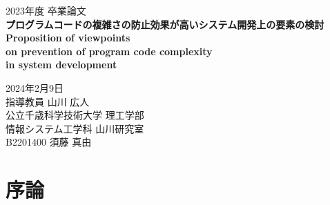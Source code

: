 \documentclass[12pt, a4paper]{jreport}
\begin{document}
    \thispagestyle{empty}
    \begin{center}

        \vspace{20mm}
        {\Large\noindent 2023年度 卒業論文}\\
        \vspace{40mm}
        {\huge\noindent\textbf{プログラムコードの複雑さの防止効果が高いシステム開発上の要素の検討}}\\
        \medskip
        \vspace{\baselineskip}
        {\LARGE\noindent\textbf{Proposition of viewpoints}}\\
        \medskip
        {\LARGE\noindent\textbf{on prevention of program code complexity }}\\
        \medskip
        {\LARGE\noindent\textbf{in system development}}\\
        \vspace{40mm}

        {\Large\noindent
        2024年2月9日\\
        \vspace{\baselineskip}
        指導教員 山川 広人   \\
        \vspace{\baselineskip}
        公立千歳科学技術大学 理工学部\\
        情報システム工学科 山川研究室\\
        \vspace{\baselineskip}
        B2201400 須藤 真由 \\
        }
        \vspace{40mm}

    \end{center}
    \tableofcontents
    \chapter{序論}
\end{document}
